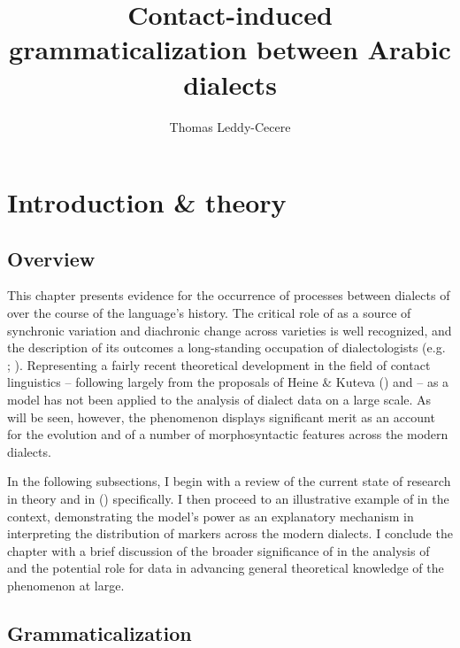 \documentclass[output=paper]{langsci/langscibook}
\author{Thomas Leddy-Cecere\affiliation{Bennington College}}
\title{Contact-induced grammaticalization between Arabic dialects}
\begin{document}
\maketitle
 
 
\section{ Introduction \& theory}

\subsection{ Overview}


This chapter presents evidence for the occurrence of  processes between dialects of  over the course of the language’s history. The critical role of  as a source of synchronic variation and diachronic change across  varieties is well recognized, and the description of its outcomes a long-standing occupation of  dialectologists (e.g. \citealt{BehnstedtWoidich2005}; \citealt{Miller2007}). Representing a fairly recent theoretical development in the field of contact linguistics – following largely from the proposals of Heine \& Kuteva (\citeyear{HeineKuteva2003,HeineKuteva2005}) and \citet{Dahl2001} –  as a model has not been applied to the analysis of  dialect data on a large scale. As will be seen, however, the phenomenon displays significant merit as an account for the evolution and  of a number of morphosyntactic features across the modern  dialects. 

In the following subsections, I begin with a review of the current state of research in  theory and in  () specifically. I then proceed to an illustrative example of  in the  context, demonstrating the model’s power as an explanatory mechanism in interpreting the distribution of   markers across the modern dialects. I conclude the chapter with a brief discussion of the broader significance of  in the analysis of  and the potential role for  data in advancing general theoretical knowledge of the phenomenon at large.

\subsection{ Grammaticalization}\label{sec:gram}
\end{document}
